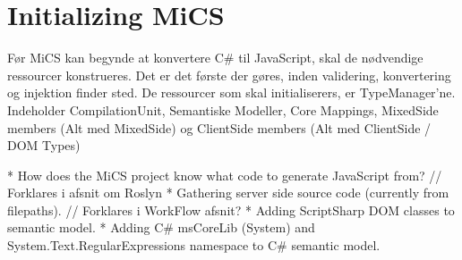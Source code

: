 \section{Initializing MiCS} %
\label{sec:initializing_mics}

Før MiCS kan begynde at konvertere C# til JavaScript, skal de nødvendige ressourcer konstrueres. 
Det er det første der gøres, inden validering, konvertering og injektion finder sted.
De ressourcer som skal initialiserers, er TypeManager'ne.
	Indeholder CompilationUnit, Semantiske Modeller, Core Mappings, MixedSide members (Alt med MixedSide) og ClientSide members (Alt med ClientSide / DOM Types) 


* How does the MiCS project know what code to generate JavaScript from? // Forklares i afsnit om Roslyn
* Gathering server side source code (currently from filepaths). // Forklares i WorkFlow afsnit?
* Adding ScriptSharp DOM classes to semantic model.
* Adding C# msCoreLib (System) and System.Text.RegularExpressions namespace to C# semantic model.



